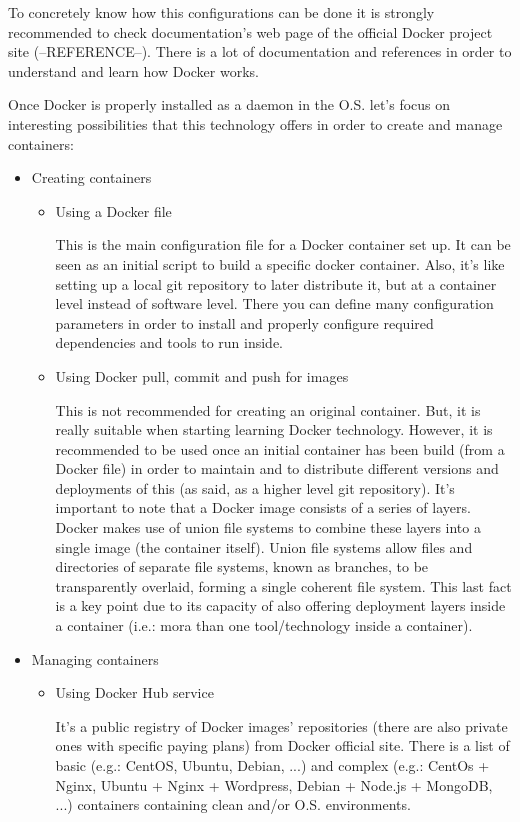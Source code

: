 To concretely know how this configurations can be done it is strongly recommended to check documentation's web page of the official Docker project site (--REFERENCE--). There is a lot of documentation and references in order to understand and learn how Docker works.

Once Docker is properly installed as a daemon in the O.S. let's focus on interesting possibilities that this technology offers in order to create and manage containers:

\begin{itemize}
\item Creating containers
	\begin{itemize}
	\item Using a Docker file \hfill
	
	This is the main configuration file for a Docker container set up. It can be seen as an initial script to build a specific docker container. Also, it's like setting up a local git repository to later distribute it, but at a container level instead of software level. There you can define many configuration parameters in order to install and properly configure required dependencies and tools to run inside. 	
	
	\item Using Docker pull, commit and push for images

	This is not recommended for creating an original container. But, it is really suitable when starting learning Docker technology. However, it is recommended to be used once an initial container has been build (from a Docker file) in order to maintain and to distribute different versions and deployments of this (as said, as a higher level git repository).	 
It's important to note that a Docker image consists of a series of layers. Docker makes use of union file systems to combine these layers into a single image (the container itself). Union file systems allow files and directories of separate file systems, known as branches, to be transparently overlaid, forming a single coherent file system. This last fact is a key point due to its capacity of also offering deployment layers inside a container (i.e.: mora than one tool/technology inside a container).
	
	\end{itemize}
\item Managing containers 
	\begin{itemize}
	\item Using Docker Hub service

	It's a public registry of Docker images' repositories (there are also private ones with specific paying plans) from Docker official site. There is a list of basic (e.g.: CentOS, Ubuntu, Debian, ...) and complex (e.g.: CentOs + Nginx, Ubuntu + Nginx + Wordpress, Debian + Node.js + MongoDB, ...) containers containing clean and/or O.S. environments. 
	

\end{itemize}
\end{itemize}
